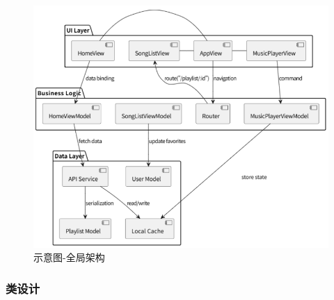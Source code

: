 \documentclass{base}
\numberwithin{figure}{section} %
\begin{document}
\begin{figure}[H]
    \centering
    \includegraphics[width=\textwidth]{images/5-7.png}
    \caption{示意图-全局架构}
\end{figure}

\subsubsection{类设计}
\end{document}
